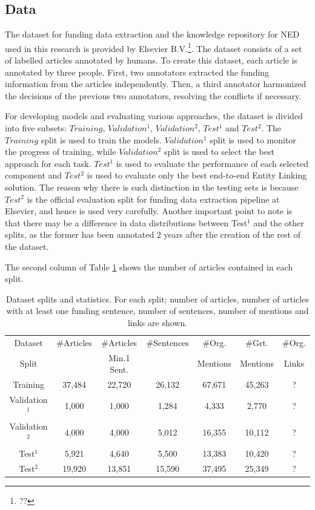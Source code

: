 \documentclass{article}
\theoremstyle{definition}
\theoremstyle{remark}
\begin{document}
\subsection{Data}

The dataset for funding data extraction and the knowledge repository for NED used in this research is provided by Elsevier B.V.\textcolor{red}{\footnote{??}}. The dataset consists of a set of labelled articles annotated by humans. To create this dataset, each article is annotated by three people. First, two annotators extracted the funding information from the articles independently. Then, a third annotator harmonized the decisions of the previous two annotators, resolving the conflicts if necessary. 

For developing models and evaluating various approaches, the dataset is divided into five subsets: $Training$, $Validation^{1}$, $Validation^{2}$, $Test^{1}$ and $Test^{2}$. The $Training$ split is used to train the models. $Validation^{1}$ split is used to monitor the progress of training, while $Validation^{2}$ split is used to select the best approach for each task. $Test^{1}$ is used to evaluate the performance of each selected component and $Test^{2}$ is used to evaluate only the best end-to-end Entity Linking solution. The reason why there is such distinction in the testing sets is because $Test^{2}$ is the official evaluation split for funding data extraction pipeline at Elsevier, and hence is used very carefully. Another important point to note is that there may be a difference in data distributions between Test$^{1}$ and the other splits, as the former has been annotated $2$ years after the creation of the rest of the dataset.

The second column of Table \ref{tab:datasets} shows the number of articles contained in each split. 

\begin{table}[h!]
    \centering
    \begin{tabular}{ccccccc}
    Dataset & \#Articles & \#Articles & \#Sentences &\#Org.& \#Grt.& \#Org. \\
    Split & & Min.1 Sent.& &Mentions&Mentions&Links \\
    \hline
    Training  & 37,484 &22,720&26,132& 67,671 &45,263 &?\\
    Validation$^{1}$ & 1,000&1,000&1,284&4,333&2,770&?\\
    Validation$^{2}$ & 4,000&4,000&5,012&16,355 & 10,112&?\\
    Test$^{1}$ & 5,921 &4,640 & 5,500 & 13,383 & 10,420 &? \\
    Test$^{2}$ & 19,920 & 13,851 & 15,590 &37,495&25,349& ?\\
    \end{tabular}
    \caption{Dataset splits and statistics. For each split; number of articles, number of articles with at least one funding sentence, number of sentences, number of mentions and links are shown.}
    \label{tab:datasets}
\end{table}
\end{document}
